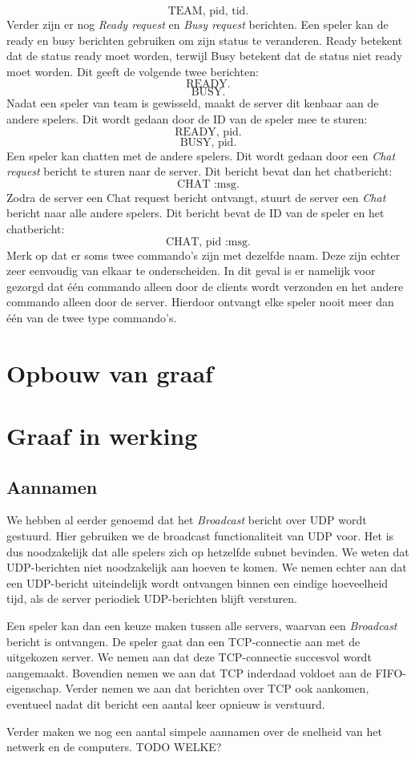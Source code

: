 \documentclass[a4paper,11pt]{article}
\begin{document}
    \[
    \text{TEAM, pid, tid.}
    \]
    Verder zijn er nog \emph{Ready request} en \emph{Busy request} berichten. Een speler kan de ready en busy berichten gebruiken om zijn status te veranderen. Ready betekent dat de status ready moet worden, terwijl Busy betekent dat de status niet ready moet worden. Dit geeft de volgende twee berichten:
    \[
    \text{READY.}
    \]
    \[
    \text{BUSY.}
    \]
    Nadat een speler van team is gewisseld, maakt de server dit kenbaar aan de andere spelers. Dit wordt gedaan door de ID van de speler mee te sturen:
    \[
    \text{READY, pid.}
    \]
    \[
    \text{BUSY, pid.}
    \]
    Een speler kan chatten met de andere spelers. Dit wordt gedaan door een \emph{Chat request} bericht te sturen naar de server. Dit bericht bevat dan het chatbericht:
    \[
    \text{CHAT :msg.}
    \]
    Zodra de server een Chat request bericht ontvangt, stuurt de server een \emph{Chat} bericht naar alle andere spelers. Dit bericht bevat de ID van de speler en het chatbericht:
    \[
    \text{CHAT, pid :msg.}
    \]
    Merk op dat er soms twee commando's zijn met dezelfde naam. Deze zijn echter zeer eenvoudig van elkaar te onderscheiden. In dit geval is er namelijk voor gezorgd dat \'e\'en commando alleen door de clients wordt verzonden en het andere commando alleen door de server. Hierdoor ontvangt elke speler nooit meer dan \'e\'en van de twee type commando's.

    \section{Opbouw van graaf}

    \section{Graaf in werking}

    \subsection{Aannamen}
    We hebben al eerder genoemd dat het \emph{Broadcast} bericht over UDP wordt gestuurd. Hier gebruiken we de broadcast functionaliteit van UDP voor. Het is dus noodzakelijk dat alle spelers zich op hetzelfde subnet bevinden. We weten dat UDP-berichten niet noodzakelijk aan hoeven te komen. We nemen echter aan dat een UDP-bericht uiteindelijk wordt ontvangen binnen een eindige hoeveelheid tijd, als de server periodiek UDP-berichten blijft versturen.

    Een speler kan dan een keuze maken tussen alle servers, waarvan een \emph{Broadcast} bericht is ontvangen. De speler gaat dan een TCP-connectie aan met de uitgekozen server. We nemen aan dat deze TCP-connectie succesvol wordt aangemaakt. Bovendien nemen we aan dat TCP inderdaad voldoet aan de FIFO-eigenschap. Verder nemen we aan dat berichten over TCP ook aankomen, eventueel nadat dit bericht een aantal keer opnieuw is verstuurd.
    
    Verder maken we nog een aantal simpele aannamen over de snelheid van het netwerk en de computers. TODO WELKE?
\end{document}
